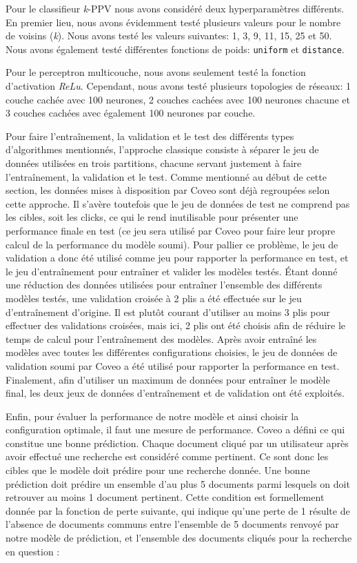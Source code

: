 \break
Pour le classifieur \textit{k}-PPV nous avons considéré deux hyperparamètres différents. En premier lieu, nous avons évidemment testé plusieurs valeurs pour le nombre de voisins (\textit{k}). Nous avons testé les valeurs suivantes: 1, 3, 9, 11, 15, 25 et 50. 
Nous avons également testé différentes fonctions de poids: \texttt{uniform} et \texttt{distance}.

Pour le perceptron multicouche, nous avons seulement testé la fonction d'activation \textit{ReLu}. Cependant, nous avons testé plusieurs topologies de réseaux: 1 couche cachée avec 100 neurones, 2 couches cachées avec 100 neurones chacune et 3 couches cachées avec également 100 neurones par couche.
\break

Pour faire l'entraînement, la validation et le test des différents types d'algorithmes mentionnés, l'approche classique consiste à séparer le jeu de données utilisées en trois partitions, chacune servant justement à faire l'entraînement, la validation et le test. Comme mentionné au début de cette section, les données mises à disposition par Coveo sont déjà regroupées selon cette approche. Il s'avère toutefois que le jeu de données de test ne comprend pas les cibles, soit les clicks, ce qui le rend inutilisable pour présenter une performance finale en test (ce jeu sera utilisé par Coveo pour faire leur propre calcul de la performance du modèle soumi). Pour pallier ce problème, le jeu de validation a donc été utilisé comme jeu pour rapporter la performance en test, et le jeu d'entraînement pour entraîner et valider les modèles testés. Étant donné une réduction des données utilisées pour entraîner l'ensemble des différents modèles testés, une validation croisée à 2 plis a été effectuée sur le jeu d'entraînement d'origine. Il est plutôt courant d'utiliser au moins 3 plis pour effectuer des validations croisées, mais ici, 2 plis ont été choisis afin de réduire le temps de calcul pour l'entraînement des modèles. Après avoir entraîné les modèles avec toutes les différentes configurations choisies, le jeu de données de validation soumi par Coveo a été utilisé pour rapporter la performance en test. Finalement, afin d'utiliser un maximum de données pour entraîner le modèle final, les deux jeux de données d'entraînement et de validation ont été exploités.
\break

Enfin, pour évaluer la performance de notre modèle et ainsi choisir la configuration optimale, il faut une mesure de performance. Coveo a défini ce qui constitue une bonne prédiction. Chaque document cliqué par un utilisateur après avoir effectué une recherche est considéré comme pertinent. Ce sont donc les cibles que le modèle doit prédire pour une recherche donnée. Une bonne prédiction doit prédire un ensemble d'au plus 5 documents parmi lesquels on doit retrouver au moins 1 document pertinent. Cette condition est formellement donnée par la fonction de perte suivante, qui indique qu'une perte de 1 résulte de l'absence de documents communs entre l'ensemble de 5 documents renvoyé par notre modèle de prédiction, et l'ensemble des documents cliqués pour la recherche en question :

